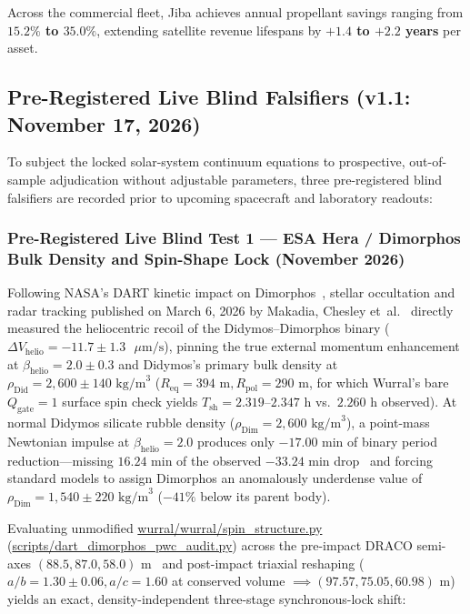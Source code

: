 \documentclass[11pt,a4paper]{article}
\begin{document}
Across the commercial fleet, Jiba achieves annual propellant savings ranging from \textbf{$15.2\%$ to $35.0\%$}, extending satellite revenue lifespans by \textbf{$+1.4$ to $+2.2$ years} per asset.


\subsection{Pre-Registered Live Blind Falsifiers (v1.1: November 17, 2026)}
\label{subsec:preregistered_v11_falsifiers}

To subject the locked solar-system continuum equations to prospective, out-of-sample adjudication without adjustable parameters, three pre-registered blind falsifiers are recorded prior to upcoming spacecraft and laboratory readouts:

\subsubsection{Pre-Registered Live Blind Test 1 --- ESA Hera / Dimorphos Bulk Density and Spin-Shape Lock (November 2026)}
\label{subsubsec:hera_dimorphos_prereg}

Following NASA's DART kinetic impact on Dimorphos~\cite{Daly2023,Thomas2023}, stellar occultation and radar tracking published on March 6, 2026 by Makadia, Chesley et~al.~\cite{Makadia2026} directly measured the heliocentric recoil of the Didymos--Dimorphos binary ($\Delta V_{\text{helio}} = -11.7 \pm 1.3\text{ }\mu\text{m/s}$), pinning the true external momentum enhancement at $\beta_{\text{helio}} = 2.0 \pm 0.3$ and Didymos's primary bulk density at $\rho_{\text{Did}} = 2{,}600 \pm 140\text{ kg/m}^3$ ($R_{\text{eq}} = 394\text{ m}, R_{\text{pol}} = 290\text{ m}$, for which Wurral's bare $Q_{\text{gate}} = 1$ surface spin check yields $T_{\text{sh}} = 2.319\text{--}2.347\text{ h}$ vs.~$2.260\text{ h}$ observed). At normal Didymos silicate rubble density ($\rho_{\text{Dim}} = 2{,}600\text{ kg/m}^3$), a point-mass Newtonian impulse at $\beta_{\text{helio}} = 2.0$ produces only $-17.00\text{ min}$ of binary period reduction---missing $16.24\text{ min}$ of the observed $-33.24\text{ min}$ drop~\cite{Scheirich2024} and forcing standard models to assign Dimorphos an anomalously underdense value of $\rho_{\text{Dim}} = 1{,}540 \pm 220\text{ kg/m}^3$ ($-41\%$ below its parent body).

Evaluating unmodified \url{wurral/wurral/spin_structure.py} (\url{scripts/dart_dimorphos_pwc_audit.py}) across the pre-impact DRACO semi-axes $(88.5, 87.0, 58.0)\text{ m}$~\cite{Daly2023} and post-impact triaxial reshaping ($a/b = 1.30 \pm 0.06, a/c = 1.60$ at conserved volume $\implies (97.57, 75.05, 60.98)\text{ m}$)~\cite{Naidu2024} yields an exact, density-independent three-stage synchronous-lock shift:
\end{document}
